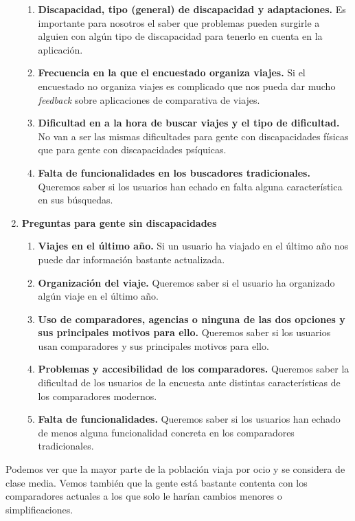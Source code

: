 \begin{enumerate}
    \begin{enumerate}
        \item\textbf{Discapacidad, tipo (general) de discapacidad y adaptaciones.} Es importante para nosotros el saber que problemas pueden surgirle a alguien con algún tipo de discapacidad para tenerlo en cuenta en la aplicación.
    \item\textbf{Frecuencia en la que el encuestado organiza viajes.} Si el encuestado no organiza viajes es complicado que nos pueda dar mucho \textit{feedback} sobre aplicaciones de comparativa de viajes.
    \item\textbf{Dificultad en a la hora de buscar viajes y el tipo de dificultad.} No van a ser las mismas dificultades para gente con discapacidades físicas que para gente con discapacidades psíquicas.
    \item\textbf{Falta de funcionalidades en los buscadores tradicionales.} Queremos saber si los usuarios han echado en falta alguna característica en sus búsquedas.
    \end{enumerate}
    \item\textbf{Preguntas para gente sin discapacidades}
    \begin{enumerate}
        \item\textbf{Viajes en el último año.} Si un usuario ha viajado en el último año nos puede dar información bastante actualizada.
        \item\textbf{Organización del viaje.} Queremos saber si el usuario ha organizado algún viaje en el último año.
        \item\textbf{Uso de comparadores, agencias o ninguna de las dos opciones y sus principales motivos para ello.} Queremos saber si los usuarios usan comparadores y sus principales motivos para ello.
        \item\textbf{Problemas y accesibilidad de los comparadores.} Queremos saber la dificultad de los usuarios de la encuesta ante distintas características de los comparadores modernos.
        \item\textbf{Falta de funcionalidades.} Queremos saber si los usuarios han echado de menos alguna funcionalidad concreta en los comparadores tradicionales.
    \end{enumerate}
    
\end{enumerate}

Podemos ver que la mayor parte de la población viaja por ocio y se considera de clase media. Vemos también que la gente está bastante contenta con los comparadores actuales a los que solo le harían cambios menores o simplificaciones.


